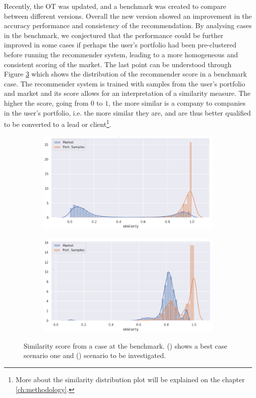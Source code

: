 Recently, the OT was updated, and a benchmark was created to compare between different versions. Overall the new version showed an improvement in the accuracy performance and consistency of the recommendation. By analysing cases in the benchmark, we conjectured that the performance could be further improved in some cases if perhaps the user's portfolio had been pre-clustered before running the recommender system, leading to a more homogeneous and consistent scoring of the market. The last point can be understood through Figure \ref{fig:simi-dist} which shows the distribution of the recommender score in a benchmark case. The recommender system is trained with samples from the user's portfolio and market and its score allows for an interpretation of a similarity measure. The higher the score, going from $0$ to $1$, the more similar is a company to companies in the user's portfolio, i.e. the more similar they are, and are thus better qualified to be converted to a lead or client\footnote{More about the similarity distribution plot will be explained on the chapter \ref{ch:methodology}.}.

\begin{figure}[!ht]
    \begin{subfigure}{\linewidth}
        \centering
        \includegraphics[width=10cm]{fig/ch1-simi-dist-expected.png}
        \caption{}
        \label{fig:simi-dist:expected}
    \end{subfigure}
    \begin{subfigure}{\linewidth}
        \centering
        \includegraphics[width=10cm]{fig/ch1-simi-dist-to-investigate.png}
        \caption{}
        \label{fig:simi-dist:to-investigate}
    \end{subfigure}
    \caption{Similarity score from a case at the benchmark. () shows a best case scenario one and () scenario to be investigated.}
    \label{fig:simi-dist}
\end{figure}

